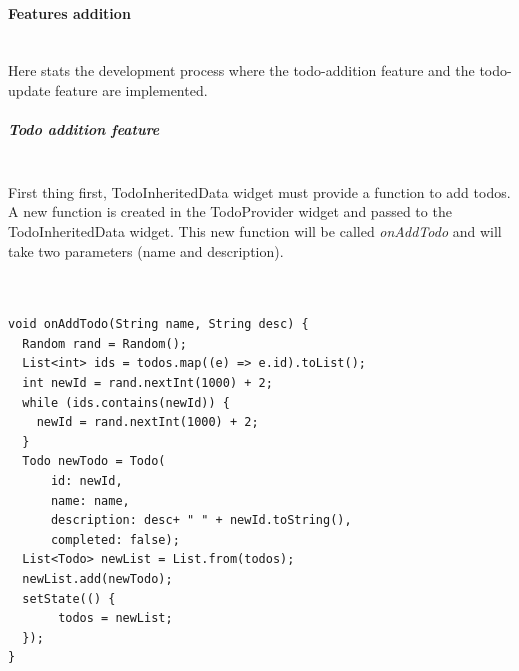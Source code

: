 \paragraph{Features addition} \mbox{} \\
\label{par:feature_addition_inherited_widget}
Here stats the development process where the todo-addition feature and the todo-update feature are implemented.

\subparagraph{Todo addition feature} \mbox{} \\
\label{subpar: todo_addition_feature_inherited_widget}
First thing first, TodoInheritedData widget must provide a function to add todos. A new function is created in the TodoProvider widget and passed to the TodoInheritedData widget. This new function will be called \textit{onAddTodo} and will take two parameters (name and description).
\mbox{}\\


\mbox{}\\
\begin{code}
\begin{verbatim}

void onAddTodo(String name, String desc) {
  Random rand = Random();
  List<int> ids = todos.map((e) => e.id).toList();
  int newId = rand.nextInt(1000) + 2;
  while (ids.contains(newId)) {
    newId = rand.nextInt(1000) + 2;
  }
  Todo newTodo = Todo(
      id: newId,
      name: name,
      description: desc+ " " + newId.toString(),
      completed: false);
  List<Todo> newList = List.from(todos);
  newList.add(newTodo);
  setState(() {
       todos = newList;
  });
}
\end{verbatim}
\end{code}
\mbox{}\\

